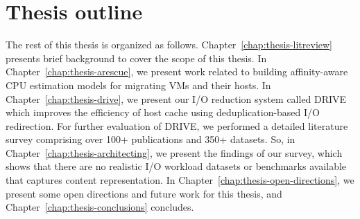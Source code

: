\section{Thesis outline}
The rest of this thesis is organized as follows. 
Chapter~\ref{chap:thesis-litreview} presents brief background 
to cover the scope of this thesis.
In Chapter~\ref{chap:thesis-arescue}, we present work
related to building affinity-aware CPU estimation models 
for migrating VMs and their hosts. In Chapter~\ref{chap:thesis-drive},
we present our I/O reduction system called DRIVE which
improves the efficiency of host cache using deduplication-based
I/O redirection. For further evaluation of DRIVE, we 
performed a detailed literature survey comprising over 100+
publications and 350+ datasets. So, in 
Chapter~\ref{chap:thesis-architecting},
we present the findings of our survey, 
which shows that there are no realistic I/O workload datasets 
or benchmarks available that captures content representation.
In Chapter~\ref{chap:thesis-open-directions}, we present
some open directions and future work for this thesis,
and Chapter~\ref{chap:thesis-conclusions} concludes.

